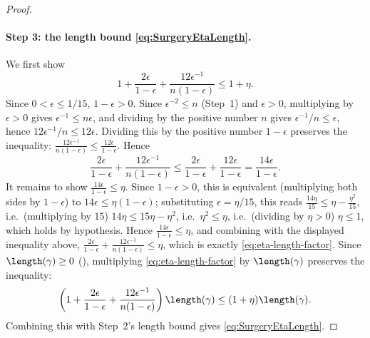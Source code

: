 \begin{proof}
  \paragraph{Step 3: the length bound \eqref{eq:SurgeryEtaLength}.} We first show
  \begin{equation}
    \label{eq:eta-length-factor}
    1+\frac{2\epsilon}{1-\epsilon}+\frac{12\epsilon^{-1}}{n(1-\epsilon)} \le 1+\eta
    .
  \end{equation}
  Since $0<\epsilon\le1/15$, $1-\epsilon>0$. Since $\epsilon^{-2}\le n$ (Step~1) and $\epsilon>0$,
  multiplying by $\epsilon>0$ gives $\epsilon^{-1}\le n\epsilon$, and dividing by the positive
  number $n$ gives $\epsilon^{-1}/n\le\epsilon$, hence $12\epsilon^{-1}/n\le12\epsilon$. Dividing
  this by the positive number $1-\epsilon$ preserves the inequality:
  $\tfrac{12\epsilon^{-1}}{n(1-\epsilon)} \le \tfrac{12\epsilon}{1-\epsilon}$. Hence
  \[
    \frac{2\epsilon}{1-\epsilon}+\frac{12\epsilon^{-1}}{n(1-\epsilon)} \le
    \frac{2\epsilon}{1-\epsilon}+\frac{12\epsilon}{1-\epsilon} = \frac{14\epsilon}{1-\epsilon}
    .
  \]
  It remains to show $\tfrac{14\epsilon}{1-\epsilon}\le\eta$. Since $1-\epsilon>0$, this is
  equivalent (multiplying both sides by $1-\epsilon$) to $14\epsilon\le\eta(1-\epsilon)$; substituting
  $\epsilon=\eta/15$, this reads $\tfrac{14\eta}{15}\le\eta-\tfrac{\eta^2}{15}$, i.e.\ (multiplying
  by $15$) $14\eta\le15\eta-\eta^2$, i.e.\ $\eta^2\le\eta$, i.e.\ (dividing by $\eta>0$) $\eta\le1$,
  which holds by hypothesis. Hence $\tfrac{14\epsilon}{1-\epsilon}\le\eta$, and combining with the
  displayed inequality above,
  $\tfrac{2\epsilon}{1-\epsilon}+\tfrac{12\epsilon^{-1}}{n(1-\epsilon)}\le\eta$, which is exactly
  \eqref{eq:eta-length-factor}. Since $\length(\gamma)\ge0$ (), multiplying
  \eqref{eq:eta-length-factor} by $\length(\gamma)$ preserves the inequality:
  \[
    \left(1+\frac{2\epsilon}{1-\epsilon}+\frac{12\epsilon^{-1}}{n(1-\epsilon)}\right)\length(\gamma)
    \le (1+\eta)\length(\gamma)
    .
  \]
  Combining this with Step~2's length bound gives \eqref{eq:SurgeryEtaLength}.


\end{proof}
